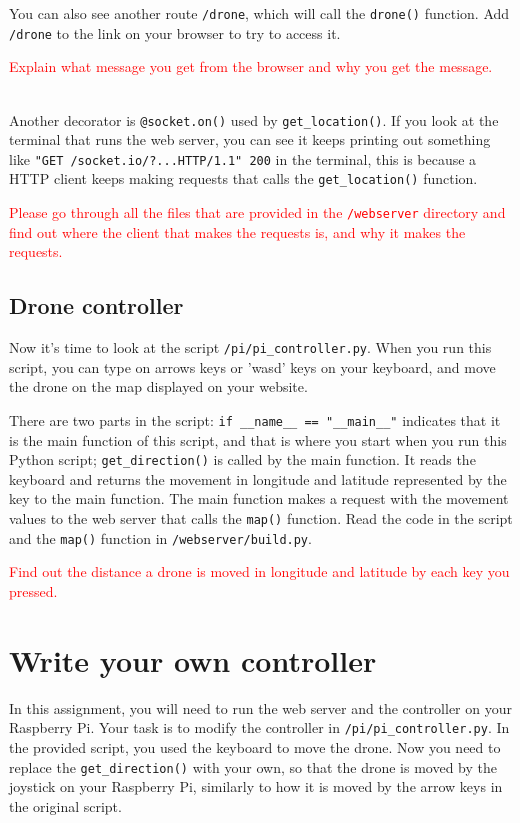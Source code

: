 \documentclass{article}
\begin{document}
You can also see another route \texttt{/drone}, which will call the \texttt{drone()} function. Add \texttt{/drone} to the link on your browser to try to access it.\\

\parbox[t]{14cm}{\textcolor{red}{Explain what message you get from the browser and why you get the message.}}\\


Another decorator is \texttt{@socket.on()} used by \texttt{get\_location()}. If you look at the terminal that runs the web server, you can see it keeps printing out something like \texttt{"GET /socket.io/?...HTTP/1.1" 200} in the terminal, this is because a HTTP client keeps making requests that calls the \texttt{get\_location()} function.\\

\parbox[t]{14cm}{\textcolor{red}{Please go through all the files that are provided in the \texttt{/webserver} directory and find out where the client that makes the requests is, and why it makes the requests.}}


\subsection{Drone controller}
Now it's time to look at the script \texttt{/pi/pi\_controller.py}. When you run this script, you can type on arrows keys or 'wasd' keys on your keyboard, and move the drone on the map displayed on your website.

There are two parts in the script: \texttt{if \_\_name\_\_ == "\_\_main\_\_"} indicates that it is the main function of this script, and that is where you start when you run this Python script; \texttt{get\_direction()} is called by the main function. It reads the keyboard and returns the movement in longitude and latitude represented by the key to the main function. The main function makes a request with the movement values to the web server that calls the \texttt{map()} function. Read the code in the script and the \texttt{map()} function in \texttt{/webserver/build.py}.\\

\parbox[t]{14cm}{\textcolor{red}{Find out the distance a drone is moved in longitude and latitude by each key you pressed.}}





\section{Write your own controller}
In this assignment, you will need to run the web server and the controller on your Raspberry Pi. Your task is to modify the controller in \texttt{/pi/pi\_controller.py}. In the provided script, you used the keyboard to move the drone. Now you need to replace the \texttt{get\_direction()} with your own, so that the drone is moved by the joystick on your Raspberry Pi, similarly to how it is moved by the arrow keys in the original script.
\end{document}
